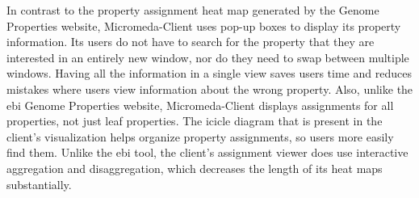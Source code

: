 In contrast to the property assignment heat map generated by the Genome Properties website, Micromeda-Client uses pop-up boxes to display its property information. Its users do not have to search for the property that they are interested in an entirely new window, nor do they need to swap between multiple windows. Having all the information in a single view saves users time and reduces mistakes where users view information about the wrong property. Also, unlike the \gls{ebi}  Genome Properties website, Micromeda-Client displays assignments for all properties, not just leaf properties. The icicle diagram that is present in the client's visualization helps organize property assignments, so users more easily find them. Unlike the \gls{ebi}  tool, the client's assignment viewer does use interactive aggregation and disaggregation, which decreases the length of its heat maps substantially.

